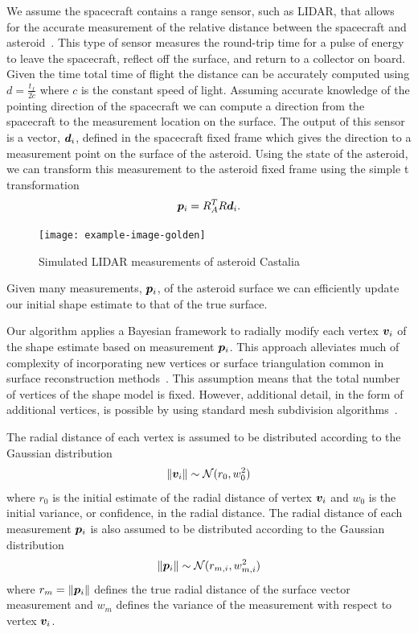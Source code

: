\documentclass[letterpaper, paper,11pt]{AAS}		%
\begin{document}
We assume the spacecraft contains a range sensor, such as LIDAR, that allows for the accurate measurement of the relative distance between the spacecraft and asteroid~\cite{zuber1997,zuber2000}.
This type of sensor measures the round-trip time for a pulse of energy to leave the spacecraft, reflect off the surface, and return to a collector on board.
Given the time total time of flight the distance can be accurately computed using \( d = \frac{t_f}{2 c} \) where \( c \) is the constant speed of light.
Assuming accurate knowledge of the pointing direction of the spacecraft we can compute a direction from the spacecraft to the measurement location on the surface.
The output of this sensor is a vector, \( \bm{d}_i \), defined in the spacecraft fixed frame which gives the direction to a measurement point on the surface of the asteroid. 
Using the state of the asteroid, we can transform this measurement to the asteroid fixed frame using the simple t transformation
\begin{align*}
    \bm{p}_i = R_A^T R \bm{d}_i .
\end{align*}
\begin{figure}
    \centering
    \texttt{[image: example-image-golden]}
    \caption{Simulated LIDAR measurements of asteroid Castalia~\label{fig:lidar_example}}
\end{figure}
Given many measurements, \( \bm{p}_i \), of the asteroid surface we can efficiently update our initial shape estimate to that of the true surface.

Our algorithm applies a Bayesian framework to radially modify each vertex \( \bm{v}_i\) of the shape estimate based on measurement \( \bm{p}_i\). 
This approach alleviates much of complexity of incorporating new vertices or surface triangulation common in surface reconstruction methods~\cite{berg2008}.
This assumption means that the total number of vertices of the shape model is fixed.
However, additional detail, in the form of additional vertices, is possible by using standard mesh subdivision algorithms~\cite{orourke1998}.

The radial distance of each vertex is assumed to be distributed according to the Gaussian distribution
\begin{align*}
    \left\| \bm{v}_i \right\| \sim \mathcal{N}(r_0, w_0^2)
\end{align*}
where \( r_0 \) is the initial estimate of the radial distance of vertex \( \bm{v}_i\) and \( w_0 \) is the initial variance, or confidence, in the radial distance.
The radial distance of each measurement \( \bm{p}_i\) is also assumed to be distributed according to the Gaussian distribution
\begin{align*}
    \left\| \bm{p}_i \right\| \sim \mathcal{N}(r_{m,i}, w_{m,i}^2)
\end{align*}
where \( r_m = \left\| \bm{p}_i \right\| \) defines the true radial distance of the surface vector measurement and \( w_m\) defines the variance of the measurement with respect to vertex \( \bm{v}_i\).
\end{document}
